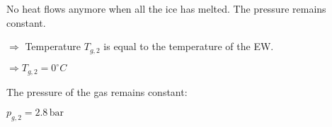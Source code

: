 No heat flows anymore when all the ice has melted. The pressure remains constant.  

\( \Rightarrow \) Temperature \( T_{g,2} \) is equal to the temperature of the EW.  

\( \Rightarrow T_{g,2} = 0^\circ C \)  

The pressure of the gas remains constant:  

\( p_{g,2} = 2.8 \, \text{bar} \)